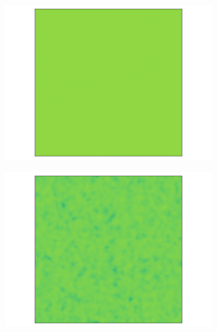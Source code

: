 \documentclass[../main.tex]{subfiles}
\begin{document}
\begin{figure}[H]
\begin{subfigure}[b]{0.11\textwidth}
        \includegraphics[keepaspectratio, width = \linewidth]{../figures/fig3.9.2.3.png}
    \end{subfigure}
    \hfill
    \begin{subfigure}[b]{0.11\textwidth}
        \centering 
        \includegraphics[keepaspectratio, width = \linewidth]{../figures/fig3.9.2.4.png}
    \end{subfigure}
    \hfill
    \begin{subfigure}[b]{0.11\textwidth}
        \centering 

\end{subfigure}
\end{figure}
\end{document}
